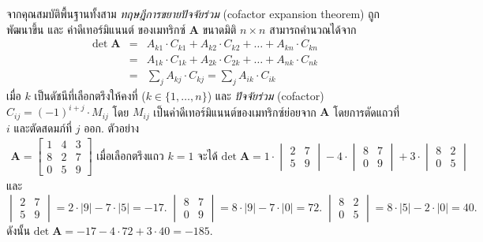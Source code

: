 จากคุณสมบัติพื้นฐานทั้งสาม
\textit{ทฤษฎีการขยายปัจจัยร่วม} (cofactor expansion theorem)
ถูกพัฒนาขึ้น
และ 
ค่าดีเทอร์มิแนนต์ 
ของเมทริกซ์ $\bm{A}$ ขนาดมิติ  $n \times n$ 
สามารถคำนวณได้จาก
\begin{eqnarray}
\mathrm{det}\; \bm{A} &=& 
A_{k1} \cdot C_{k1} + A_{k2} \cdot  C_{k2}
+ \ldots + A_{kn} \cdot  C_{kn}
\nonumber \\
&=&
A_{1k} \cdot C_{1k} + A_{2k} \cdot  C_{2k}
+ \ldots + A_{nk} \cdot  C_{nk}
\nonumber \\
&=&
\sum_j A_{kj} \cdot C_{kj} = 
\sum_j A_{ik} \cdot C_{ik}
\label{eq: lin alg det cofactor}
\end{eqnarray}
เมื่อ 
$k$ เป็นดัชนีที่เลือกตรึงให้คงที่ ($k \in \{1, \ldots, n\}$)
และ
\textit{ปัจจัยร่วม} (cofactor) 
$C_{ij} = (-1)^{i+j} \cdot M_{ij}$
โดย $M_{ij}$ เป็นค่าดีเทอร์มิแนนต์ของเมทริกซ์ย่อยจาก $\bm{A}$ โดยการตัดแถวที่ $i$ และตัดสดมภ์ที่ $j$ ออก.
%
ตัวอย่าง 
\begin{eqnarray}
\bm{A} = \begin{bmatrix}
1 & 4 & 3 \\
8 & 2 & 7 \\
0 & 5 & 9
\end{bmatrix}
\mbox{ เมื่อเลือกตรึงแถว }
k = 1
\mbox{ จะได้ }
\mathrm{det}\; \bm{A} = 
1 \cdot 
\begin{vmatrix}
2 & 7 \\
5 & 9
\end{vmatrix}
-4 \cdot 
\begin{vmatrix}
8 & 7 \\
0 & 9
\end{vmatrix}
+ 3 \cdot 
\begin{vmatrix}
8 & 2 \\
0 & 5
\end{vmatrix}
\nonumber 
\end{eqnarray}
และ
\[
\begin{vmatrix}
	2 & 7 \\
	5 & 9
\end{vmatrix}
= 2 \cdot |9| - 7 \cdot |5| = -17.
\;
\begin{vmatrix}
8 & 7 \\
0 & 9
\end{vmatrix}
= 8 \cdot |9| - 7 \cdot |0| = 72.
\;
\begin{vmatrix}
8 & 2 \\
0 & 5
\end{vmatrix}
= 8 \cdot |5| - 2 \cdot |0| = 40.
\]
ดังนั้น
$\mathrm{det}\; \bm{A} = -17 -4 \cdot 72 + 3 \cdot 40 = -185.$


